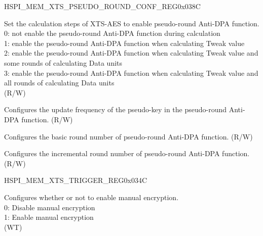 \begin{register}{H}{SPI\_MEM\_XTS\_PSEUDO\_ROUND\_CONF\_REG}{0x038C}\label{regdesc:SPIMEMXTSPSEUDOROUNDCONFREG}
    \regnewline%
    \begin{regdesc}\begin{reglist}
    \label{fielddesc:SPIMEMMODEPSEUDO}\item [SPI\_MEM\_MODE\_PSEUDO] Set the calculation steps of XTS-AES to enable pseudo-round Anti-DPA function. \\
    0: not enable the pseudo-round Anti-DPA function during calculation\\
    1: enable the pseudo-round Anti-DPA function when calculating Tweak value\\
    2: enable the pseudo-round Anti-DPA function when calculating Tweak value and some rounds of calculating Data units\\
    3: enable the pseudo-round Anti-DPA function when calculating Tweak value and all rounds of calculating Data units\\
    (R/W)
    \label{fielddesc:SPIMEMPSEUDORNGCNT}\item [SPI\_MEM\_PSEUDO\_RNG\_CNT] Configures the update frequency of the pseudo-key in the pseudo-round Anti-DPA function. (R/W)
    \label{fielddesc:SPIMEMPSEUDOBASE}\item [SPI\_MEM\_PSEUDO\_BASE] Configures the basic round number of pseudo-round Anti-DPA function. (R/W)
    \label{fielddesc:SPIMEMPSEUDOINC}\item [SPI\_MEM\_PSEUDO\_INC] Configures the incremental round number of pseudo-round Anti-DPA function. (R/W)
    \end{reglist}\end{regdesc}
    \end{register}


\begin{register}{H}{SPI\_MEM\_XTS\_TRIGGER\_REG}{0x034C}\label{regdesc:SPIMEMXTSTRIGGERREG}
%
%
\regnewline%
\begin{regdesc}\begin{reglist}
\label{fielddesc:SPIMEMXTSTRIGGER}\item [SPI\_MEM\_XTS\_TRIGGER] Configures whether or not to enable manual encryption. \\
0: Disable manual encryption\\
1: Enable manual encryption\\
(WT)
\end{reglist}\end{regdesc}
\end{register}

